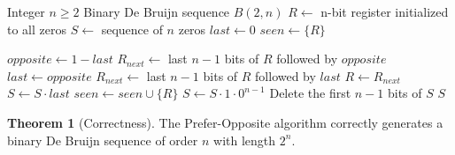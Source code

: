 \documentclass{article}
\theoremstyle{definition}
\newtheorem{theorem}{Theorem}
\begin{document}
\begin{algorithm}
\caption{Prefer-Opposite Algorithm for $B(2, n)$}
\begin{algorithmic}[1]
\Require Integer $n \geq 2$
\Ensure Binary De Bruijn sequence $B(2, n)$
\State $R \gets $ n-bit register initialized to all zeros
\State $S \gets $ sequence of $n$ zeros 
\State $last \gets 0$ 
\State $seen \gets \{R\}$ 

    \State $opposite \gets 1-last$ 
    \State $R_{next} \gets $ last $n-1$ bits of $R$ followed by $opposite$
        \State $last \gets opposite$ 
    \Else
        \State $R_{next} \gets $ last $n-1$ bits of $R$ followed by $last$
    \EndIf
    \State $R \gets R_{next}$ 
    \State $S \gets S \cdot last$ 
    \State $seen \gets seen \cup \{R\}$
\EndWhile
\State $S \gets S \cdot 1 \cdot 0^{n-1}$ 
\State Delete the first $n-1$ bits of $S$ 
\State \Return $S$
\end{algorithmic}
\end{algorithm}

\begin{theorem}[Correctness]
The Prefer-Opposite algorithm correctly generates a binary De Bruijn sequence of order $n$ with length $2^n$.
\end{theorem}
\end{document}
